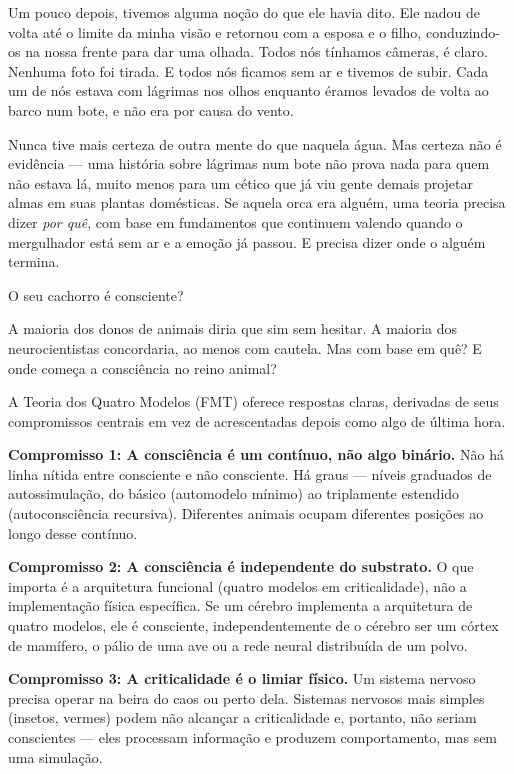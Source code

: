 \documentclass[11pt, twoside, openright]{book}
\begin{document}
Um pouco depois, tivemos alguma noção do que ele havia dito. Ele nadou de volta até o limite da minha visão e retornou com a esposa e o filho, conduzindo-os na nossa frente para dar uma olhada. Todos nós tínhamos câmeras, é claro. Nenhuma foto foi tirada. E todos nós ficamos sem ar e tivemos de subir. Cada um de nós estava com lágrimas nos olhos enquanto éramos levados de volta ao barco num bote, e não era por causa do vento.

Nunca tive mais certeza de outra mente do que naquela água. Mas certeza não é evidência --- uma história sobre lágrimas num bote não prova nada para quem não estava lá, muito menos para um cético que já viu gente demais projetar almas em suas plantas domésticas. Se aquela orca era alguém, uma teoria precisa dizer \textit{por quê}, com base em fundamentos que continuem valendo quando o mergulhador está sem ar e a emoção já passou. E precisa dizer onde o alguém termina.

O seu cachorro é consciente?

A maioria dos donos de animais diria que sim sem hesitar. A maioria dos neurocientistas concordaria, ao menos com cautela. Mas com base em quê? E onde começa a consciência no reino animal?

A Teoria dos Quatro Modelos (FMT) oferece respostas claras, derivadas de seus compromissos centrais em vez de acrescentadas depois como algo de última hora.

\textbf{Compromisso 1: A consciência é um contínuo, não algo binário.} Não há linha nítida entre consciente e não consciente. Há graus --- níveis graduados de autossimulação, do básico (automodelo mínimo) ao triplamente estendido (autoconsciência recursiva). Diferentes animais ocupam diferentes posições ao longo desse contínuo.

\textbf{Compromisso 2: A consciência é independente do substrato.} O que importa é a arquitetura funcional (quatro modelos em criticalidade), não a implementação física específica. Se um cérebro implementa a arquitetura de quatro modelos, ele é consciente, independentemente de o cérebro ser um córtex de mamífero, o pálio de uma ave ou a rede neural distribuída de um polvo.

\textbf{Compromisso 3: A criticalidade é o limiar físico.} Um sistema nervoso precisa operar na beira do caos ou perto dela. Sistemas nervosos mais simples (insetos, vermes) podem não alcançar a criticalidade e, portanto, não seriam conscientes --- eles processam informação e produzem comportamento, mas sem uma simulação.
\end{document}
